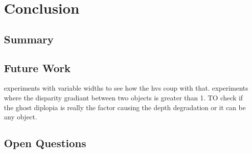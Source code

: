 \chapter{Conclusion}

\section{Summary}

\section{Future Work}
experiments with variable widths to see how the hvs coup with that.
experiments where the disparity gradiant between two objects is greater than 1. TO check if the ghost diplopia is really the factor causing the depth degradation or it can be any object.

\section{Open Questions}